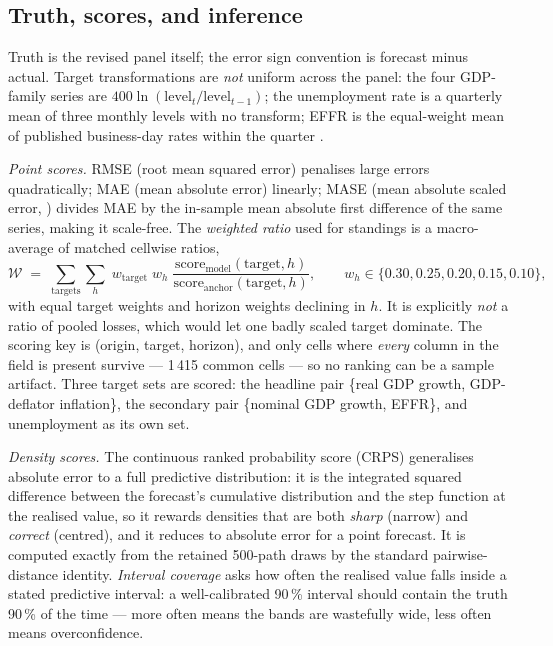 \documentclass[11pt,a4paper]{article}
\begin{document}
\subsection{Truth, scores, and inference}
\label{sec:design-scores}

Truth is the revised panel itself; the error sign convention is forecast minus actual. Target
transformations are \emph{not} uniform across the panel: the four GDP-family series are
$400\ln(\text{level}_t/\text{level}_{t-1})$; the unemployment rate is a quarterly mean of three
monthly levels with no transform; EFFR is the equal-weight mean of published business-day rates
within the quarter \citep{ny_effr}.

\emph{Point scores.} RMSE (root mean squared error) penalises large errors quadratically; MAE
(mean absolute error) linearly; MASE (mean absolute scaled error, \citealp{hyndmankoehler2006})
divides MAE by the in-sample mean absolute first difference of the same series, making it
scale-free. The \emph{weighted ratio} used for standings is a macro-average of matched cellwise
ratios,
\begin{equation}
  \mathcal{W} \;=\; \sum_{\text{targets}}\sum_{h}\;
  w_{\text{target}}\; w_h \;\frac{\text{score}_{\text{model}}(\text{target},h)}
  {\text{score}_{\text{anchor}}(\text{target},h)},
  \qquad
  w_h \in \{0.30, 0.25, 0.20, 0.15, 0.10\},
\end{equation}
with equal target weights and horizon weights declining in $h$. It is explicitly \emph{not} a
ratio of pooled losses, which would let one badly scaled target dominate. The scoring key is
(origin, target, horizon), and only cells where \emph{every} column in the field is present
survive --- 1\,415 common cells --- so no ranking can be a sample artifact. Three target sets are
scored: the headline pair \{real GDP growth, GDP-deflator inflation\}, the secondary pair
\{nominal GDP growth, EFFR\}, and unemployment as its own set.

\emph{Density scores.} The continuous ranked probability score (CRPS) generalises absolute error
to a full predictive distribution: it is the integrated squared difference between the forecast's
cumulative distribution and the step function at the realised value, so it rewards densities that
are both \emph{sharp} (narrow) and \emph{correct} (centred), and it reduces to absolute error for
a point forecast. It is computed exactly from the retained 500-path draws by the standard
pairwise-distance identity. \emph{Interval coverage} asks how often the realised value falls
inside a stated predictive interval: a well-calibrated 90\,\% interval should contain the truth
90\,\% of the time --- more often means the bands are wastefully wide, less often means
overconfidence.
\end{document}
